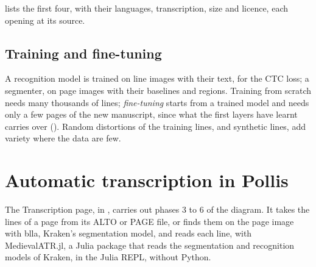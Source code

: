 \gt{}\gt{} lists the first four, with their languages,
transcription, size and licence, each opening at its source.

\subsection{Training and fine-tuning}
A recognition model is trained on line images with their text, for the CTC loss; a segmenter, on page images with
their baselines and regions. Training from scratch needs many thousands of lines; \emph{fine-tuning} starts from a
trained model and needs only a few pages of the new manuscript, since what the first layers have learnt carries over
(). Random distortions of the training lines, and
synthetic lines, add variety where the data are few.

\section{Automatic transcription in Pollis}\label{sec:pollis}
The Transcription page, in \gt{}\gt{}, carries out phases 3 to 6 of
the diagram. It takes the lines of a page from its ALTO or PAGE file, or finds them on the page image with blla,
Kraken's segmentation model, and reads each line, with MedievalATR.jl, a Julia package that reads the segmentation and
recognition models of Kraken, in the Julia REPL, without Python.

